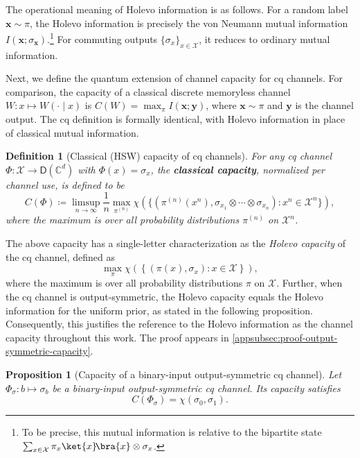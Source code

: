 \documentclass[11pt]{article}
\newtheorem{prop}[prop]{Proposition}
\newtheorem{definition}{Definition}[section]
\theoremstyle{remark}
\newcommand{\ketbra}[2]{\ket{#1}\!\bra{#2}}
\newcommand{\cX}{\mathcal{X}}
\newcommand{\C}{\mathbb{C}}
\newcommand{\Dens}{\mathsf{D}}
\newcommand{\bx}{\mathbf{x}}
\newcommand{\by}{\mathbf{y}}
\begin{document}
The operational meaning of Holevo information is as follows. For a random label $\bx \sim \pi$, the Holevo information is precisely the von Neumann mutual information $I(\bx;\sigma_{\bx})$.\footnote{To be precise, this mutual information is relative to the bipartite state $\sum_{x \in \cX}{\pi_x\ketbra{x}{x} \otimes \sigma_x}$.} For commuting outputs $\{\sigma_x\}_{x \in \cX}$, it reduces to ordinary mutual information.

Next, we define the quantum extension of channel capacity for cq channels. For comparison, the capacity of a classical discrete memoryless channel $W : x \mapsto W(\cdot \mid x)$ is $C(W) = \max_\pi I(\bx;\by)$, where $\bx \sim \pi$ and $\by$ is the channel output. The cq definition is formally identical, with Holevo information in place of classical mutual information.


\begin{definition}[Classical (HSW) capacity of cq channels]
\label{def:holevo-capacity}
For any cq channel $\Phi : \cX \to \Dens(\C^d)$ with $\Phi(x) = \sigma_x$, the \textbf{classical capacity}, normalized per channel use, is defined to be
\begin{equation*}
C(\Phi)
\coloneqq
\limsup_{n \to \infty}\frac{1}{n}\max_{\pi^{(n)}}
\chi\left(\{(\pi^{(n)}(x^n),\sigma_{x_1} \otimes \cdots \otimes \sigma_{x_n}) : x^n \in \cX^n\}\right),
\end{equation*}
where the maximum is over all probability distributions $\pi^{(n)}$ on $\cX^n$.
\end{definition}

The above capacity has a single-letter characterization as the \emph{Holevo capacity} of the cq channel, defined as 
\begin{equation*}
    \max_{\pi} \chi \left(\left\{(\pi(x),\sigma_x) : x \in \cX\right\}\right), 
\end{equation*}
where the maximum is over all probability distributions $\pi$ on $\cX$.
Further, when the cq channel is output-symmetric, the Holevo capacity equals the Holevo information for the uniform prior, as stated in the following proposition. Consequently, this justifies the reference to the Holevo information as the channel capacity throughout this work. The proof appears in \cref{appsubsec:proof-output-symmetric-capacity}.

\begin{prop}[Capacity of a binary-input output-symmetric cq channel]
\label{prop:output-symmetric-capacity}
Let $\Phi_\sigma : b \mapsto \sigma_b$ be a binary-input output-symmetric cq channel. Its capacity satisfies
\begin{equation*}
C(\Phi_\sigma) = \chi(\sigma_0,\sigma_1).
\end{equation*}
\end{prop}
\end{document}

